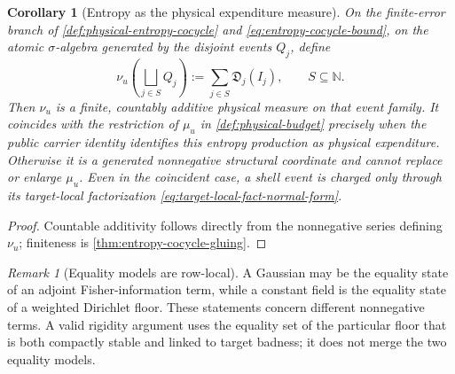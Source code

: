 \documentclass[11pt]{article}
\numberwithin{section}{part}
\theoremstyle{plain}
\newtheorem{corollary}[corollary]{Corollary}
\theoremstyle{definition}
\theoremstyle{remark}
\newtheorem{remark}[remark]{Remark}
\newcommand{\Production}{\mathfrak D}
\begin{document}
\begin{corollary}[Entropy as the physical expenditure measure]
\label{cor:entropy-physical-budget}
On the finite-error branch of \cref{def:physical-entropy-cocycle} and
\eqref{eq:entropy-cocycle-bound}, on the atomic
\(\sigma\)-algebra generated by the disjoint events \(Q_j\), define
\[
 \nu_u\!\left(\bigsqcup_{j\in S}Q_j\right)
 :=\sum_{j\in S}\Production_j(I_j),
 \qquad S\subseteq\mathbb N.
\]
Then \(\nu_u\) is a finite, countably additive physical measure on that event
family.  It coincides with the restriction of \(\mu_u\) in
\cref{def:physical-budget} precisely when the public carrier identity
identifies this entropy production as physical expenditure.  Otherwise it is
a generated nonnegative structural coordinate and cannot replace or enlarge
\(\mu_u\).  Even in the coincident case, a shell event is charged only through
its target-local factorization \eqref{eq:target-local-fact-normal-form}.
\end{corollary}

\begin{proof}
Countable additivity follows directly from the nonnegative series defining
\(\nu_u\); finiteness is \cref{thm:entropy-cocycle-gluing}.
\end{proof}

\begin{remark}[Equality models are row-local]
A Gaussian may be the equality state of an adjoint Fisher-information term,
while a constant field is the equality state of a weighted Dirichlet floor.
These statements concern different nonnegative terms.  A valid rigidity
argument uses the equality set of the particular floor that is both compactly
stable and linked to target badness; it does not merge the two equality
models.
\end{remark}
\end{document}
